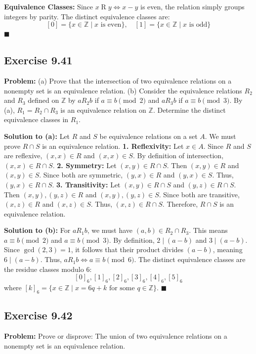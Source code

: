 \documentclass[11pt, a4paper]{article}
\theoremstyle{definition}
\theoremstyle{remark}
\newcommand{\Z}{\mathbb{Z}}
\begin{document}
\textbf{Equivalence Classes:}
Since $x \mathrel{R} y \iff x - y$ is even, the relation simply groups integers by parity.
The distinct equivalence classes are:
\[
    [0] = \{ x \in \Z \mid x \text{ is even} \}, \quad [1] = \{ x \in \Z \mid x \text{ is odd} \}
\]
$\blacksquare$

\subsection*{Exercise 9.41}
\textbf{Problem:} 
(a) Prove that the intersection of two equivalence relations on a nonempty set is an equivalence relation.
(b) Consider the equivalence relations $R_2$ and $R_3$ defined on $\Z$ by $a \mathrel{R_2} b$ if $a \equiv b \pmod 2$ and $a \mathrel{R_3} b$ if $a \equiv b \pmod 3$. By (a), $R_1 = R_2 \cap R_3$ is an equivalence relation on $\Z$. Determine the distinct equivalence classes in $R_1$.

\textbf{Solution to (a):}
Let $R$ and $S$ be equivalence relations on a set $A$. We must prove $R \cap S$ is an equivalence relation.
\textbf{1. Reflexivity:} Let $x \in A$. Since $R$ and $S$ are reflexive, $(x, x) \in R$ and $(x, x) \in S$. By definition of intersection, $(x, x) \in R \cap S$.
\textbf{2. Symmetry:} Let $(x, y) \in R \cap S$. Then $(x, y) \in R$ and $(x, y) \in S$. Since both are symmetric, $(y, x) \in R$ and $(y, x) \in S$. Thus, $(y, x) \in R \cap S$.
\textbf{3. Transitivity:} Let $(x, y) \in R \cap S$ and $(y, z) \in R \cap S$. Then $(x, y), (y, z) \in R$ and $(x, y), (y, z) \in S$. Since both are transitive, $(x, z) \in R$ and $(x, z) \in S$. Thus, $(x, z) \in R \cap S$.
Therefore, $R \cap S$ is an equivalence relation.

\textbf{Solution to (b):}
For $a \mathrel{R_1} b$, we must have $(a, b) \in R_2 \cap R_3$. This means $a \equiv b \pmod 2$ and $a \equiv b \pmod 3$.
By definition, $2 \mid (a - b)$ and $3 \mid (a - b)$. Since $\gcd(2, 3) = 1$, it follows that their product divides $(a - b)$, meaning $6 \mid (a - b)$.
Thus, $a \mathrel{R_1} b \iff a \equiv b \pmod 6$.
The distinct equivalence classes are the residue classes modulo 6:
\[
    [0]_6, [1]_6, [2]_6, [3]_6, [4]_6, [5]_6
\]
where $[k]_6 = \{ x \in \Z \mid x = 6q + k \text{ for some } q \in \Z \}$.
$\blacksquare$

\subsection*{Exercise 9.42}
\textbf{Problem:} Prove or disprove: The union of two equivalence relations on a nonempty set is an equivalence relation.
\end{document}
